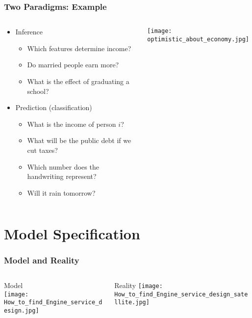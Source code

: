 \documentclass[mathserif, xcolor=table, svgnames]{beamer}
\begin{document}
\begin{frame}
  \frametitle{Two Paradigms: Example}
  \begin{columns}
    \begin{column}{0.6\linewidth}
      \begin{itemize}
      \item Inference
        \begin{itemize}
        \item Which features determine income?
        \item Do married people earn more?
        \item What is the effect of graduating a school?
        \end{itemize}
      \item Prediction (classification)
        \begin{itemize}
        \item What is the income of person $i$?
        \item What will be the public debt if we cut taxes?
        \item Which number does the handwriting represent?
        \item Will it rain tomorrow?
        \end{itemize}
      \end{itemize}
    \end{column}
    \begin{column}{0.4\linewidth}
      \texttt{[image: optimistic\_about\_economy.jpg]}
    \end{column}
  \end{columns}
\end{frame}

{

}

\section[Model]{Model Specification}
\frame{\tableofcontents[currentsection]}

\begin{frame}
  \frametitle{Model and Reality}
  \begin{columns}[T]
    \begin{column}{0.5\linewidth}
      \begin{center}
        Model\\
        \texttt{[image: How\_to\_find\_Engine\_service\_design.jpg]}
      \end{center}
    \end{column}
    \begin{column}{0.5\linewidth}
      \begin{center}
        Reality
        \texttt{[image: How\_to\_find\_Engine\_service\_design\_satellite.jpg]}
      \end{center}
    \end{column}
  \end{columns}
\end{frame}
\end{document}
